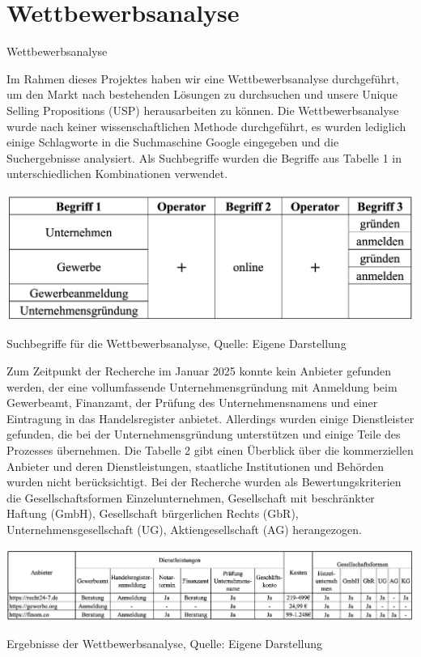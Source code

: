 \newpage

\section{Wettbewerbsanalyse} \label{wettbewerbsanalyse}
Wettbewerbsanalyse

Im Rahmen dieses Projektes haben wir eine Wettbewerbsanalyse durchgeführt, um den Markt nach bestehenden Lösungen zu durchsuchen und unsere Unique Selling Propositions (USP) herausarbeiten zu können. Die Wettbewerbsanalyse wurde nach keiner wissenschaftlichen Methode durchgeführt, es wurden lediglich einige Schlagworte in die Suchmaschine Google eingegeben und die Suchergebnisse analysiert. Als Suchbegriffe wurden die Begriffe aus Tabelle 1 in unterschiedlichen Kombinationen verwendet. 

\begin{table}[H]
    \includegraphics[width=1\textwidth]{Tabelle 1.png}
    \centering
    \caption{Suchbegriffe für die Wettbewerbsanalyse, Quelle: Eigene Darstellung}
	\label{fig:tabelle1}
\end{table}

Zum Zeitpunkt der Recherche im Januar 2025 konnte kein Anbieter gefunden werden, der eine vollumfassende Unternehmensgründung mit Anmeldung beim Gewerbeamt, Finanzamt, der Prüfung des Unternehmensnamens und einer Eintragung in das Handelsregister anbietet. Allerdings wurden einige Dienstleister gefunden, die bei der Unternehmensgründung unterstützen und einige Teile des Prozesses übernehmen. Die Tabelle 2 gibt einen Überblick über die kommerziellen Anbieter und deren Dienstleistungen, staatliche Institutionen und Behörden wurden nicht berücksichtigt. Bei der Recherche wurden als Bewertungskriterien die Gesellschaftsformen Einzelunternehmen, Gesellschaft mit beschränkter Haftung (GmbH), Gesellschaft bürgerlichen Rechts (GbR), Unternehmensgesellschaft (UG), Aktiengesellschaft (AG) herangezogen.

\begin{table}[H]
    \includegraphics[width=1\textwidth]{Tabelle 2.png}
    \centering
    \caption{Ergebnisse der Wettbewerbsanalyse, Quelle: Eigene Darstellung}
	\label{fig:tabelle2}
\end{table}


